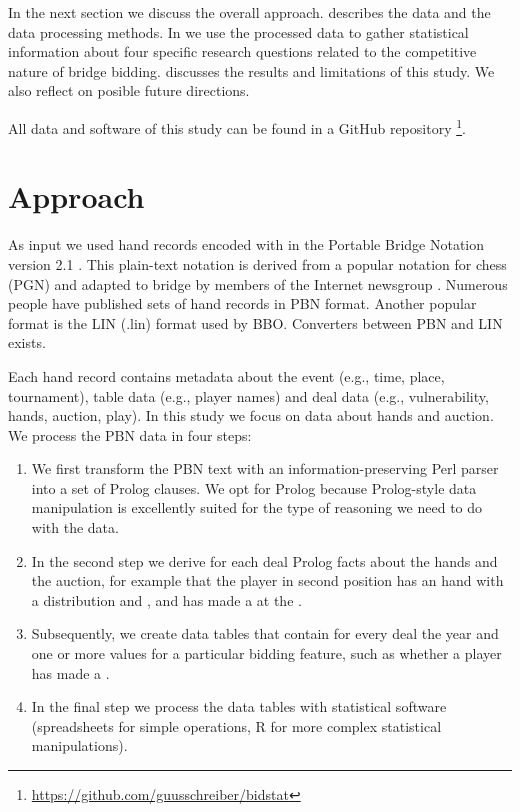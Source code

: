 \documentclass{llncs}
\begin{document}
In the next section we discuss the overall approach. 
describes the data and the data processing methods.  In
 we use the processed data to gather statistical
information about four specific research questions related to the
competitive nature of bridge bidding.   discusses
the results and limitations of this study. We also reflect on posible
future directions.
   
All data and software of this study can be found in a GitHub
repository%
\footnote{\url{https://github.com/guusschreiber/bidstat}}.


\section{Approach}
\label{sec:approach}

As input we used hand records encoded with in the Portable Bridge
Notation version 2.1 \cite{pbn21}. This plain-text notation is derived
from a popular notation for chess (PGN) and adapted to bridge by
members of the Internet newsgroup
. Numerous people have published sets of
hand records in PBN format. Another popular format is the LIN (.lin)
format used by BBO. Converters between PBN and LIN exists.

Each hand record contains metadata about the event (e.g., time, place,
tournament), table data (e.g., player names) and deal data (e.g.,
vulnerability, hands, auction, play).  In this study we focus on data
about hands and auction. We process the PBN data in four steps:

\begin{enumerate}
\item We first transform the PBN text with an information-preserving
  Perl parser into a set of Prolog clauses. We opt for Prolog because
  Prolog-style data manipulation is excellently suited for the type of
  reasoning we need to do with the data.
\item In the second step we derive for each deal Prolog facts about
  the hands and the auction, for example that the player in second
  position has an  hand with a 
  distribution and , and has made a 
  at the .
\item Subsequently, we create data tables that contain for every deal
  the year and one or more values for a particular bidding feature,
  such as whether a player has made a .
\item In the final step we process the data tables with statistical
  software (spreadsheets for simple operations, R for more complex
  statistical manipulations).
\end{enumerate}
\end{document}
